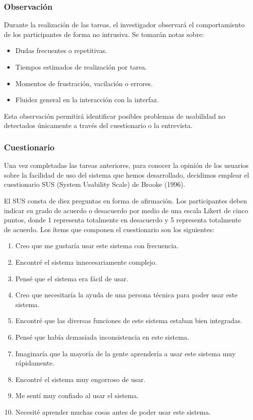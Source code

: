 \subsubsection{Observación}
Durante la realización de las tareas, el investigador observará el comportamiento de los participantes de forma no intrusiva. Se tomarán notas sobre:

\begin{itemize}
\item Dudas frecuentes o repetitivas.
\item Tiempos estimados de realización por tarea.
\item Momentos de frustración, vacilación o errores.
\item Fluidez general en la interacción con la interfaz.
\end{itemize}
Esta observación permitirá identificar posibles problemas de usabilidad no detectados únicamente a través del cuestionario o la entrevista.

\subsubsection{Cuestionario}
Una vez completadas las tareas anteriores, para conocer la opinión de los usuarios sobre la facilidad de uso del sistema que hemos desarrollado, decidimos emplear el cuestionario SUS (System Usability Scale) de Brooke (1996). 

El SUS consta de diez preguntas en forma de afirmación. Los participantes deben indicar su grado de acuerdo o desacuerdo por medio de una escala Likert de cinco puntos, donde 1 representa totalmente en desacuerdo y 5 representa totalmente de acuerdo. Los ítems que componen el cuestionario son los siguientes:

\begin{enumerate}
    \item Creo que me gustaría usar este sistema con frecuencia.
    \item Encontré el sistema innecesariamente complejo.
    \item Pensé que el sistema era fácil de usar.
    \item Creo que necesitaría la ayuda de una persona técnica para poder usar este sistema.
    \item Encontré que las diversas funciones de este sistema estaban bien integradas.
    \item Pensé que había demasiada inconsistencia en este sistema.
    \item Imaginaría que la mayoría de la gente aprendería a usar este sistema muy rápidamente.
    \item Encontré el sistema muy engorroso de usar.
    \item Me sentí muy confiado al usar el sistema.
    \item Necesité aprender muchas cosas antes de poder usar este sistema.
\end{enumerate}

